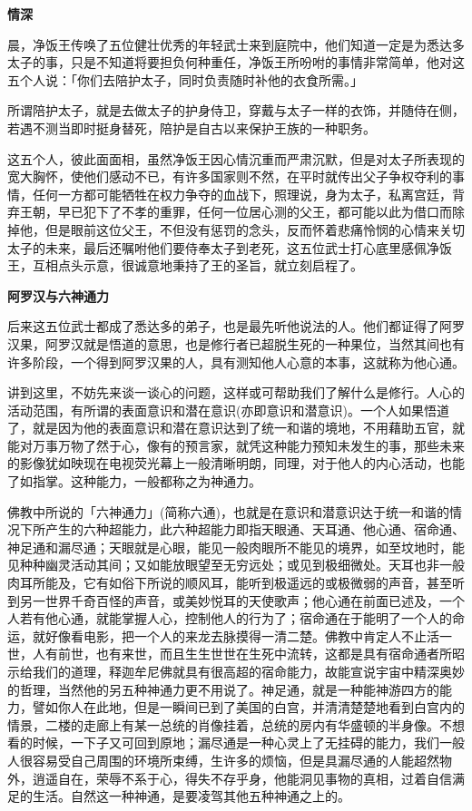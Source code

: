 \documentclass[twoside,openany]{book}
\newcommand{\mt}[1]{\textbullet \textbf{#1}}
\begin{document}
\mt{情深}

晨，净饭王传唤了五位健壮优秀的年轻武士来到庭院中，他们知道一定是为悉达多太子的事，只是不知道将要担负何种重任，净饭王所吩咐的事情非常简单，他对这五个人说：「你们去陪护太子，同时负责随时补他的衣食所需。」

所谓陪护太子，就是去做太子的护身侍卫，穿戴与太子一样的衣饰，并随侍在侧，若遇不测当即时挺身替死，陪护是自古以来保护王族的一种职务。

这五个人，彼此面面相，虽然净饭王因心情沉重而严肃沉默，但是对太子所表现的宽大胸怀，使他们感动不已，有许多国家则不然，在平时就传出父子争权夺利的事情，任何一方都可能牺牲在权力争夺的血战下，照理说，身为太子，私离宫廷，背弃王朝，早已犯下了不孝的重罪，任何一位居心测的父王，都可能以此为借口而除掉他，但是眼前这位父王，不但没有惩罚的念头，反而怀着悲痛怜悯的心情来关切太子的未来，最后还嘱咐他们要侍奉太子到老死，这五位武士打心底里感佩净饭王，互相点头示意，很诚意地秉持了王的圣旨，就立刻启程了。

\mt{阿罗汉与六神通力}

后来这五位武士都成了悉达多的弟子，也是最先听他说法的人。他们都证得了阿罗汉果，阿罗汉就是悟道的意思，也是修行者已超脱生死的一种果位，当然其间也有许多阶段，一个得到阿罗汉果的人，具有测知他人心意的本事，这就称为他心通。

讲到这里，不妨先来谈一谈心的问题，这样或可帮助我们了解什么是修行。人心的活动范围，有所谓的表面意识和潜在意识(亦即意识和潜意识)。一个人如果悟道了，就是因为他的表面意识和潜在意识达到了统一和谐的境地，不用藉助五官，就能对万事万物了然于心，像有的预言家，就凭这种能力预知未发生的事，那些未来的影像犹如映现在电视荧光幕上一般清晰明朗，同理，对于他人的内心活动，也能了如指掌。这种能力，一般都称之为神通力。

佛教中所说的「六神通力」(简称六通)，也就是在意识和潜意识达于统一和谐的情况下所产生的六种超能力，此六种超能力即指天眼通、天耳通、他心通、宿命通、神足通和漏尽通；天眼就是心眼，能见一般肉眼所不能见的境界，如至坟地时，能见种种幽灵活动其间；又如能放眼望至无穷远处；或见到极细微处。天耳也非一般肉耳所能及，它有如俗下所说的顺风耳，能听到极遥远的或极微弱的声音，甚至听到另一世界千奇百怪的声音，或美妙悦耳的天使歌声；他心通在前面已述及，一个人若有他心通，就能掌握人心，控制他人的行为了；宿命通在于能明了一个人的命运，就好像看电影，把一个人的来龙去脉摸得一清二楚。佛教中肯定人不止活一世，人有前世，也有来世，而且生生世世在生死中流转，这都是具有宿命通者所昭示给我们的道理，释迦牟尼佛就具有很高超的宿命能力，故能宣说宇宙中精深奥妙的哲理，当然他的另五种神通力更不用说了。神足通，就是一种能神游四方的能力，譬如你人在此地，但是一瞬间已到了美国的白宫，并清清楚楚地看到白宫内的情景，二楼的走廊上有某一总统的肖像挂着，总统的房内有华盛顿的半身像。不想看的时候，一下子又可回到原地；漏尽通是一种心灵上了无挂碍的能力，我们一般人很容易受自己周围的环境所束缚，生许多的烦恼，但是具漏尽通的人能超然物外，逍遥自在，荣辱不系于心，得失不存乎身，他能洞见事物的真相，过着自信满足的生活。自然这一种神通，是要凌驾其他五种神通之上的。
\end{document}
